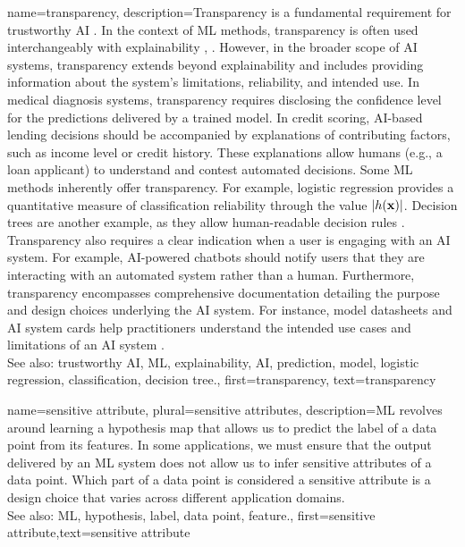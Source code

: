 {name={transparency},
	description={Transparency is a fundamental requirement for 
		trustworthy AI \cite{HLEGTrustworhtyAI}. In the context of ML 
		methods, transparency is often used interchangeably with explainability 
		\cite{JunXML2020}, \cite{gallese2023ai}. However, in the broader scope of AI 
		systems, transparency extends beyond explainability and includes providing information 
		about the system’s limitations, reliability, and intended use. 
		In medical diagnosis systems, transparency requires disclosing the confidence level 
		for the predictions delivered by a trained model. In credit scoring, 
		AI-based lending decisions should be accompanied by explanations of 
		contributing factors, such as income level or credit history. These explanations 
		allow humans (e.g., a loan applicant) to understand and contest automated decisions. 
		Some ML methods inherently offer transparency. For example, logistic regression 
		provides a quantitative measure of classification reliability through the value $|h({\bf x})|$. 
		Decision trees are another example, as they allow human-readable decision rules \cite{rudin2019stop}.
		Transparency also requires a clear indication when a user is engaging with an AI system. 
		For example, AI-powered chatbots should notify users that they are interacting with an 
		automated system rather than a human. Furthermore, transparency encompasses comprehensive 
		documentation detailing the purpose and design choices underlying the AI system. 
		For instance, model datasheets \cite{DatasheetData2021} and AI system cards \cite{10.1145/3287560.3287596} 
		help practitioners understand the intended use cases and limitations of an AI system \cite{Shahriari2017}.
					\\ 
		See also: trustworthy AI, ML, explainability, AI, prediction, model, logistic regression, classification, decision tree.},
	first={transparency}, text={transparency} 
}



{name={sensitive attribute}, plural={sensitive attributes},
	description={ML revolves around learning a hypothesis map that allows 
		us to predict the label of a data point from its features. In some 
		applications, we must ensure that the output delivered by an ML system does 
		not allow us to infer sensitive attributes of a data point. Which part 
		of a data point is considered a sensitive attribute is a design 
		choice that varies across different application domains.
					\\ 
		See also: ML, hypothesis, label, data point, feature.},
	first={sensitive attribute},text={sensitive attribute} 
}



